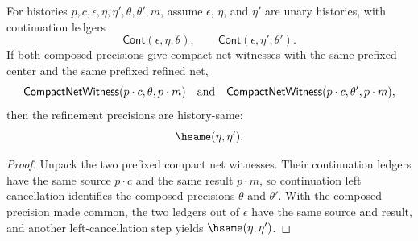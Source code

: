 \begin{theorem}
\label{thm:compact-net-witness-prefixed-composite-refinement-deterministic}
For histories $p,c,\epsilon,\eta,\eta',\theta,\theta',m$, assume
$\epsilon$, $\eta$, and $\eta'$ are unary histories, with continuation ledgers
$$
\mathsf{Cont}(\epsilon,\eta,\theta),
\qquad
\mathsf{Cont}(\epsilon,\eta',\theta').
$$
If both composed precisions give compact net witnesses with the same prefixed
center and the same prefixed refined net,
$$
\mathsf{CompactNetWitness}(p\cdot c,\theta,p\cdot m)
\quad\hbox{and}\quad
\mathsf{CompactNetWitness}(p\cdot c,\theta',p\cdot m),
$$
then the refinement precisions are history-same:
$$
\hsame(\eta,\eta').
$$
\end{theorem}
\begin{proof}
Unpack the two prefixed compact net witnesses. Their continuation ledgers have
the same source $p\cdot c$ and the same result $p\cdot m$, so continuation
left cancellation identifies the composed precisions $\theta$ and $\theta'$.
With the composed precision made common, the two ledgers out of $\epsilon$
have the same source and result, and another left-cancellation step yields
$\hsame(\eta,\eta')$.
\end{proof}

